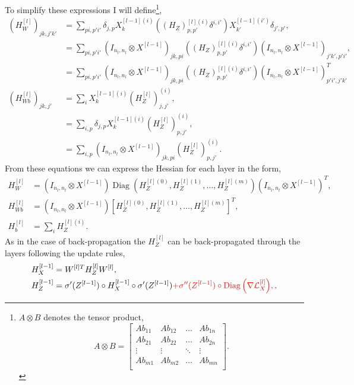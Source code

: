 \documentclass[11pt,twocolumn]{article}
\DeclareMathOperator*{\Diag}{Diag}
\begin{document}
To simplify these expressions I will define\footnote{$A \otimes B$ denotes the tensor product,
\begin{equation}
A \otimes B=\left[\begin{array}{cccc}
A b_{11} & A b_{12} & \ldots  &A b_{1n}\\
A b_{21} & A b_{22} & \ldots &A b_{2n}\\
\vdots & \vdots & \ddots &\vdots\\
A b_{m1} & A b_{m2} & \ldots &A b_{mn}\\
\end{array}
\right].
\end{equation}},
\begin{align}
(H_W^{[l]})_{jk,j'k'}&=\sum_{pi,p'i'}\delta_{j,p}X_{k}^{[l-1](i)}((H_Z)^{[l](i)}_{p,p'}\delta^{i,i'})X_{k'}^{[l-1](i')}\delta_{j',p'},\nonumber\\
&=\sum_{pi,p'i'}(I_{n_l,n_l} \otimes X^{[l-1]})_{jk,pi}((H_Z)^{[l](i)}_{p,p'}\delta^{i,i'})(I_{n_l,n_l} \otimes X^{[l-1]})_{j'k',p'i'},\nonumber\\
&=\sum_{pi,p'i'}(I_{n_l,n_l} \otimes X^{[l-1]})_{jk,pi}((H_Z)^{[l](i)}_{p,p'}\delta^{i,i'})(I_{n_l,n_l} \otimes X^{[l-1]})^T_{p'i',j'k'}\\
(H_{Wb}^{[l]})_{jk,j'}&=\sum_{i}X_{k}^{[l-1](i)}(H_Z^{[l]})^{(i)}_{j,j'},\nonumber\\
&=\sum_{i,p}\delta_{j,p} X_{k}^{[l-1](i)}(H_Z^{[l]})^{(i)}_{p,j'},\nonumber\\
&=\sum_{i,p}(I_{n_l,n_l} \otimes X^{[l-1]})_{jk,pi}(H_Z^{[l]})^{(i)}_{p,j'}.
\end{align} 
From these equations we can express the Hessian for each layer in the form,
\begin{align}
H_W^{[l]}&=(I_{n_l,n_l} \otimes X^{[l-1]})\Diag{(H_Z^{[l](0)},H_Z^{[l](1)},\ldots,H_Z^{[l](m)})}(I_{n_l,n_l} \otimes X^{[l-1]})^T,\label{H_W_calc}\\
H_{Wb}^{[l]}&=(I_{n_l,n_l} \otimes X^{[l-1]}) [H_Z^{[l](0)},H_Z^{[l](1)},\ldots,H_Z^{[l](m)}]^T,\label{H_Wb_calc}\\
H_{b}^{[l]}&=\sum_i H_Z^{[l](i)}.\label{H_b_calc}
\end{align}
As in the case of back-propagation the $H_Z^{[l]}$ can be back-propagated through the layers following the update rules,
\begin{align}
H_X^{[l-1]}&=W^{[l]T} H_Z^{[l]}W^{[l]},\label{H_X_backprop}\\
H_Z^{[l-1]}&=\sigma'{(Z^{[l-1]})}\circ H_X^{[l-1]} \circ \sigma'{(Z^{[l-1]})}\color{red}{+\sigma''{(Z^{[l-1]})}\circ \Diag{\left(\nabla \mathcal{L}^{[l]}_{X}\right)}},\label{H_Z_backprop},
\end{align}
\end{document}
